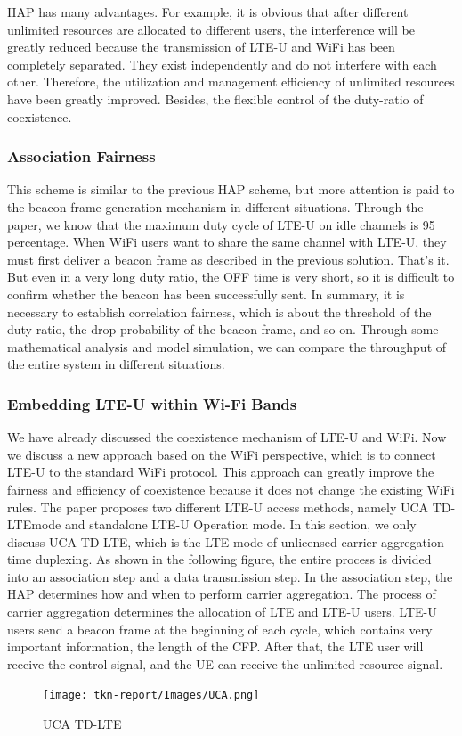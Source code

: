 \documentclass{IEEEtran}
\begin{document}
HAP has many advantages. For example, it is obvious that after different unlimited resources are allocated to different users, the interference will be greatly reduced because the transmission of LTE-U and WiFi has been completely separated. They exist independently and do not interfere with each other. Therefore, the utilization and management efficiency of unlimited resources have been greatly improved. Besides, the flexible control of the duty-ratio of coexistence.

\subsubsection{Association Fairness}
This scheme is similar to the previous HAP scheme, but more attention is paid to the beacon frame generation mechanism in different situations. Through the paper\cite{Sathya2018}, we know that the maximum duty cycle of LTE-U on idle channels is 95 percentage. When WiFi users want to share the same channel with LTE-U, they must first deliver a beacon frame as described in the previous solution. That's it. But even in a very long duty ratio, the OFF time is very short, so it is difficult to confirm whether the beacon has been successfully sent. In summary, it is necessary to establish correlation fairness, which is about the threshold of the duty ratio, the drop probability of the beacon frame, and so on. Through some mathematical analysis and model simulation, we can compare the throughput of the entire system in different situations.

\subsubsection{Embedding LTE-U within Wi-Fi Bands}
We have already discussed the coexistence mechanism of LTE-U and WiFi. Now we discuss a new approach based on the WiFi perspective, which is to connect LTE-U to the standard WiFi protocol. This approach can greatly improve the fairness and efficiency of coexistence because it does not change the existing WiFi rules. The paper\cite{Chen2017} proposes two different LTE-U access methods, namely UCA TD-LTEmode and standalone LTE-U Operation mode.
In this section, we only discuss UCA TD-LTE, which is the LTE mode of unlicensed carrier aggregation time duplexing. As shown in the following figure, the entire process is divided into an association step and a data transmission step. In the association step, the HAP determines how and when to perform carrier aggregation. The process of carrier aggregation determines the allocation of LTE and LTE-U users. LTE-U users send a beacon frame at the beginning of each cycle, which contains very important information, the length of the CFP. After that, the LTE user will receive the control signal, and the UE can receive the unlimited resource signal.
\graphicspath{{Images/}}
\maketitle
\begin{figure}[htp]
\centering
\texttt{[image: tkn-report/Images/UCA.png]}
\caption{UCA TD-LTE\cite{Chen2017}}
\label{UCA}
\end{figure}
\end{document}
